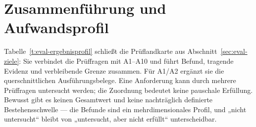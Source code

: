 
\section{Zusammenführung und Aufwandsprofil}
\label{sec:eval-ergebnisprofil}

Tabelle~\ref{t:eval-ergebnisprofil} schließt die Prüflandkarte
aus Abschnitt~\ref{sec:eval-ziele}: Sie verbindet die Prüffragen mit
A1--A10 und führt Befund, tragende Evidenz und verbleibende Grenze
zusammen. Für A1/A2 ergänzt sie die querschnittlichen Ausführungsbelege.
Eine Anforderung kann durch mehrere Prüffragen untersucht werden;
die Zuordnung bedeutet keine pauschale Erfüllung. Bewusst gibt es keinen Gesamtwert
und keine nachträglich definierte Bestehensschwelle --- die
Befunde sind ein mehrdimensionales Profil, und „nicht
untersucht`` bleibt von „untersucht, aber nicht erfüllt``
unterscheidbar.

